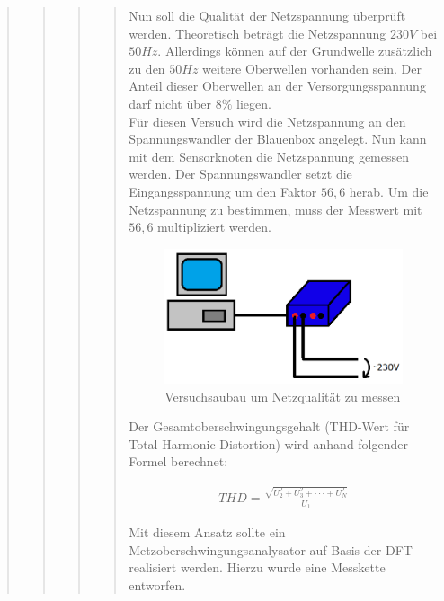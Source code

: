 \begin{quote}
\begin{quote}
\begin{quote}
			\begin{quote}
			Nun soll die Qualität der Netzspannung überprüft werden. Theoretisch beträgt die Netzspannung 
			$230V$ bei $50Hz$. Allerdings können auf der Grundwelle zusätzlich zu den
			$50Hz$ weitere Oberwellen vorhanden sein. Der Anteil dieser Oberwellen an der
			Versorgungsspannung darf nicht über $8\%$ liegen.\\
			Für diesen Versuch wird die Netzspannung an den Spannungswandler der Blauenbox angelegt. 
			Nun kann mit dem Sensorknoten die Netzspannung gemessen werden. Der Spannungswandler setzt die 
			Eingangsspannung um den Faktor $56,6$ herab. Um die Netzspannung zu
			bestimmen, muss der Messwert mit $56,6$ multipliziert werden.
			
			\begin{figure}[htb]
			\centering
			\includegraphics[width=1\textwidth]{./Bilder/Versuchsaufbau2}
			\caption{Versuchsaubau um Netzqualität zu messen}
			\end{figure}
			
			Der Gesamtoberschwingungsgehalt (THD-Wert für Total Harmonic Distortion) wird
			anhand folgender Formel berechnet:
			
			\begin{align}
			THD = \frac{\sqrt{U_2^2 + U_3^2 + \cdot \cdot \cdot + U_N^2}}{U_1}
			\end{align} 
			
			Mit diesem Ansatz sollte ein Metzoberschwingungsanalysator auf Basis der DFT
			realisiert werden. Hierzu wurde eine Messkette entworfen.
			\end{quote}
		
		\end{quote}
	
	\end{quote}

\end{quote}
